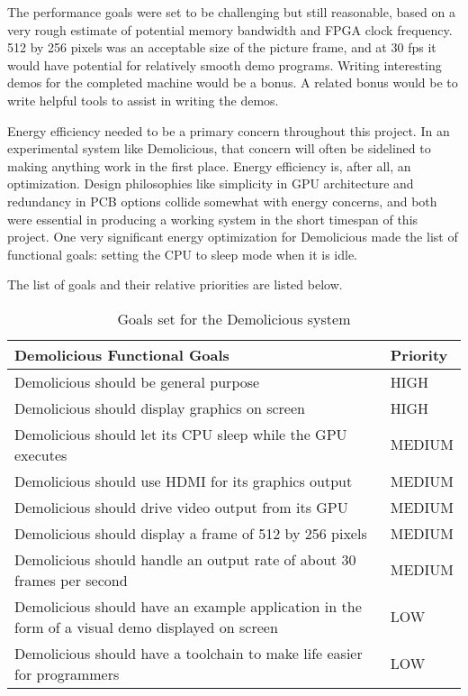 \documentclass[../main/report.tex]{subfiles}
\begin{document}
The performance goals were set to be challenging but still reasonable, based on a very rough estimate of potential memory bandwidth and FPGA clock frequency.
512 by 256 pixels was an acceptable size of the picture frame, and at 30 fps it would have potential for relatively smooth demo programs.
Writing interesting demos for the completed machine would be a bonus.
A related bonus would be to write helpful tools to assist in writing the demos.

Energy efficiency needed to be a primary concern throughout this project.
In an experimental system like Demolicious, that concern will often be sidelined to making anything work in the first place.
Energy efficiency is, after all, an optimization.
Design philosophies like simplicity in GPU architecture and redundancy in PCB options collide somewhat with energy concerns, and both were essential in producing a working system in the short timespan of this project.
One very significant energy optimization for Demolicious made the list of functional goals: setting the CPU to sleep mode when it is idle.

The list of goals and their relative priorities are listed below.

\begin{table}[htp]
    \centering
    \begin{tabular}{|p{8cm}|l|}
        \hline
        \textbf{Demolicious Functional Goals}                & \textbf{Priority} \\ \hline
        Demolicious should be general purpose                                   & HIGH    \\ \hline
        Demolicious should display graphics on screen                           & HIGH    \\ \hline
        Demolicious should let its CPU sleep while the GPU executes				& MEDIUM  \\ \hline
        Demolicious should use HDMI for its graphics output	                    & MEDIUM  \\ \hline
        Demolicious should drive video output from its GPU	                    & MEDIUM  \\ \hline
        Demolicious should display a frame of 512 by 256 pixels					& MEDIUM  \\ \hline
        Demolicious should handle an output rate of about 30 frames per second  & MEDIUM  \\ \hline
        Demolicious should have an example application in the form of a visual demo displayed on screen & LOW \\ \hline
        Demolicious should have a toolchain to make life easier for programmers & LOW     \\ \hline
    \end{tabular}
    \caption{Goals set for the Demolicious system}
    \label{tab:goals}
\end{table}
\end{document}
